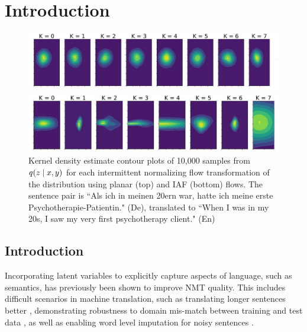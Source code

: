 
\chapter{Introduction}
\label{ch:Introduction}

\begin{figure}[ht]
	\vskip 0.2in
	\begin{center}
		\centerline{\includegraphics[width=\columnwidth]{planar_flows_plot_edited.pdf}}
		\centerline{\includegraphics[width=\columnwidth]{iaf_flows_plot_edited.pdf}}
		\caption{Kernel density estimate contour plots of 10,000 samples from $q(z \; | \;{x, y})$ for each intermittent normalizing flow transformation of the distribution using planar (top) and \ac{IAF} (bottom) flows. The sentence pair is ``Als ich in meinen 20ern war, hatte ich meine erste Psychotherapie-Patientin." (De), translated to ``When I was in my 20s, I saw my very first psychotherapy client." (En)}
		\label{flowsplot}
	\end{center}
	\vskip -0.2in
	\vspace{-4mm}
\end{figure}

\section{Introduction}

Incorporating latent variables to explicitly capture aspects of language, such as semantics, has previously been shown to improve \ac{NMT} quality. This includes difficult scenarios in machine translation, such as translating longer sentences better \cite{Zhang2016VNMT, harshil2018GNMT, Su2018VRNMT}, demonstrating robustness to domain mis-match between training and test data \cite{eikema2018AEVNMT}, as well as enabling word level imputation for noisy sentences \cite{harshil2018GNMT}. 


